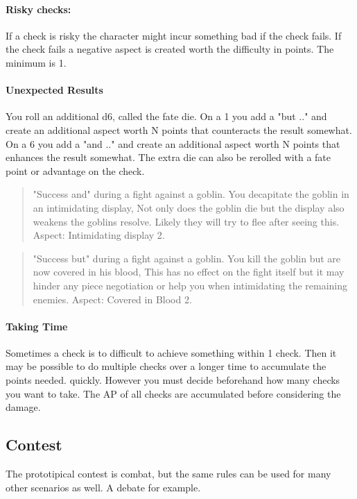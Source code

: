 \documentclass[11pt]{article}
\begin{document}
{\paragraph*{Risky checks:}
\label{sec:orgd0bc9b7}
If a check is risky the character might incur something bad if the check fails. If the check fails a negative aspect is created worth the difficulty in points. The minimum is 1. 

\paragraph*{Unexpected Results}
\label{sec:orgcb8aa4d}
You roll an additional d6, called the fate die. On a 1 you add a "but .." and create an additional aspect worth N points that counteracts the result somewhat. On a 6 you add a "and .." and create an additional aspect worth N points that enhances the result somewhat. The extra die can also be rerolled with a fate point or advantage on the check.

\begin{quote}
"Success and" during a fight against a goblin. You decapitate the goblin in an intimidating display, Not only does the goblin die but the display also weakens the goblins resolve. Likely they will try to flee after seeing this.
Aspect: Intimidating display 2.
\end{quote}

\begin{quote}
"Success but" during a fight against a goblin. You kill the goblin but are now covered in his blood, This has no effect on the fight itself but it may hinder any piece negotiation or help you when intimidating the remaining enemies.
Aspect: Covered in Blood 2.
\end{quote}

\paragraph*{Taking Time}
\label{sec:org0b881f1}
Sometimes a check is to difficult to achieve something within 1 check. Then it may be possible to do multiple checks over a longer time to accumulate the points needed. quickly. However you must decide beforehand how many checks you want to take. The AP of all checks are accumulated before considering the damage.

\subsection{Contest}
\label{sec:org8a6613b}
The prototipical contest is combat, but the same rules can be used for many other scenarios as well. A debate for example.

}
\end{document}
